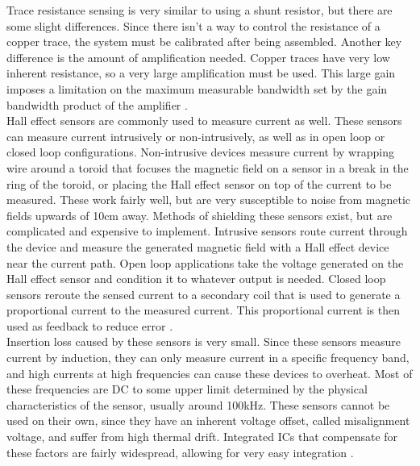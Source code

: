 Trace resistance sensing is very similar to using a shunt resistor, but there are some slight differences. Since there isn't a way to control the resistance of a copper trace, the system must be calibrated after being assembled. Another key difference is the amount of amplification needed. Copper traces have very low inherent resistance, so a very large amplification must be used. This large gain imposes a limitation on the maximum measurable bandwidth set by the gain bandwidth product of the amplifier \cite{x}. \\
\newline
Hall effect sensors are commonly used to measure current as well. These sensors can measure current intrusively or non-intrusively, as well as in open loop or closed loop configurations. Non-intrusive devices measure current by wrapping wire around a toroid that focuses the magnetic field on a sensor in a break in the ring of the toroid, or placing the Hall effect sensor on top of the current to be measured. These work fairly well, but are very susceptible to noise from magnetic fields upwards of 10cm away. Methods of shielding these sensors exist, but are complicated and expensive to implement. Intrusive sensors route current through the device and measure the generated magnetic field with a Hall effect device near the current path. Open loop applications take the voltage generated on the Hall effect sensor and condition it to whatever output is needed. Closed loop sensors reroute the sensed current to a secondary coil that is used to generate a proportional current to the measured current. This proportional current is then used as feedback to reduce error \cite{Current_Sensing}. \\
\newline
Insertion loss caused by these sensors is very small. Since these sensors measure current by induction, they can only measure current in a specific frequency band, and high currents at high frequencies can cause these devices to overheat. Most of these frequencies are DC to some upper limit determined by the physical characteristics of the sensor, usually around 100kHz. These sensors cannot be used on their own, since they have an inherent voltage offset, called misalignment voltage, and suffer from high thermal drift. Integrated ICs that compensate for these factors are fairly widespread, allowing for very easy integration \cite{Current_Sensing}.

